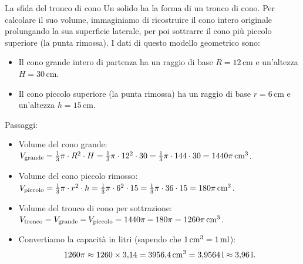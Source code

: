 \begin{esercizio}{La sfida del tronco di cono}
Un solido ha la forma di un tronco di cono. Per calcolare il suo volume, immaginiamo di ricostruire il cono intero originale prolungando la sua superficie laterale, per poi sottrarre il cono più piccolo superiore (la punta rimossa). I dati di questo modello geometrico sono:
\begin{itemize}
  \item Il cono grande intero di partenza ha un raggio di base $R = 12\,\mathrm{cm}$ e un'altezza $H = 30\,\mathrm{cm}$.
  \item Il cono piccolo superiore (la punta rimossa) ha un raggio di base $r = 6\,\mathrm{cm}$ e un'altezza $h = 15\,\mathrm{cm}$.
\end{itemize}


\responsespace{5.5cm}

\begin{soluzione}
  Passaggi:
  \begin{itemize}
    \item Volume del cono grande: $V_{\text{grande}} = \frac{1}{3} \pi \cdot R^2 \cdot H = \frac{1}{3} \pi \cdot 12^2 \cdot 30 = \frac{1}{3} \pi \cdot 144 \cdot 30 = 1440\pi\,\mathrm{cm^3}$.
    \item Volume del cono piccolo rimosso: $V_{\text{piccolo}} = \frac{1}{3} \pi \cdot r^2 \cdot h = \frac{1}{3} \pi \cdot 6^2 \cdot 15 = \frac{1}{3} \pi \cdot 36 \cdot 15 = 180\pi\,\mathrm{cm^3}$.
    \item Volume del tronco di cono per sottrazione: $V_{\text{tronco}} = V_{\text{grande}} - V_{\text{piccolo}} = 1440\pi - 180\pi = 1260\pi\,\mathrm{cm^3}$.
    \item Convertiamo la capacità in litri (sapendo che $1\,\mathrm{cm^3} = 1\,\mathrm{ml}$):
    \[
    1260\pi \approx 1260 \times 3{,}14 = 3956{,}4\,\mathrm{cm^3} = 3{,}9564\,\mathrm{l} \approx 3{,}96\,\mathrm{l}.
    \]
  \end{itemize}
\end{soluzione}
\end{esercizio}

\condnewpage


